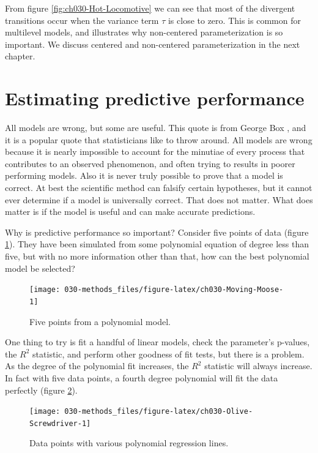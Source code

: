 \documentclass[11pt, oneside, openany]{scrbook}
\begin{document}
From figure \ref{fig:ch030-Hot-Locomotive} we can see that most of the divergent transitions occur when the variance term \(\tau\) is close to zero. This is common for multilevel models, and illustrates why non-centered parameterization is so important. We discuss centered and non-centered parameterization in the next chapter.

\hypertarget{estimating-predictive-performance}{%
\section{Estimating predictive performance}\label{estimating-predictive-performance}}

All models are wrong, but some are useful. This quote is from George Box \citep{box1976science}, and it is a popular quote that statisticians like to throw around. All models are wrong because it is nearly impossible to account for the minutiae of every process that contributes to an observed phenomenon, and often trying to results in poorer performing models. Also it is never truly possible to prove that a model is correct. At best the scientific method can falsify certain hypotheses, but it cannot ever determine if a model is universally correct. That does not matter. What does matter is if the model is useful and can make accurate predictions.

Why is predictive performance so important? Consider five points of data (figure \ref{fig:ch030-Moving-Moose}). They have been simulated from some polynomial equation of degree less than five, but with no more information other than that, how can the best polynomial model be selected?

\begin{figure}

{\centering \texttt{[image: 030-methods\_files/figure-latex/ch030-Moving-Moose-1]} 

}

\caption{Five points from a polynomial model.}\label{fig:ch030-Moving-Moose}
\end{figure}

One thing to try is fit a handful of linear models, check the parameter's p-values, the \(R^2\) statistic, and perform other goodness of fit tests, but there is a problem. As the degree of the polynomial fit increases, the \(R^2\) statistic will always increase. In fact with five data points, a fourth degree polynomial will fit the data perfectly (figure \ref{fig:ch030-Olive-Screwdriver}).

\begin{figure}

{\centering \texttt{[image: 030-methods\_files/figure-latex/ch030-Olive-Screwdriver-1]} 

}

\caption{Data points with various polynomial regression lines.}\label{fig:ch030-Olive-Screwdriver}
\end{figure}
\end{document}
